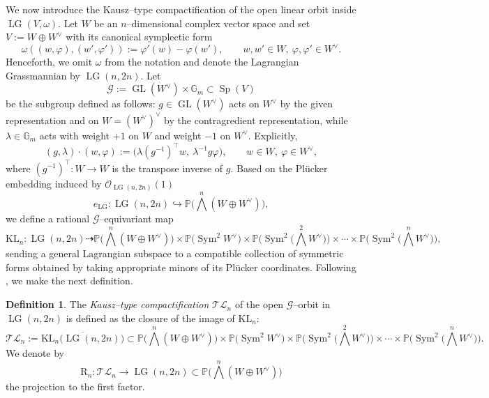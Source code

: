 \documentclass[10pt]{amsart}
\theoremstyle{definition}
\newtheorem{definition}[theorem]{Definition}
\newcommand{\Pbb}{\mathbb{P}}
\newcommand{\OO}{\mathcal{O}}
\newcommand{\LG}{\operatorname{LG}}
\DeclareMathOperator{\Sym}{Sym}
\DeclareMathOperator{\Sp}{Sp}
\newcommand{\TL}{\mathcal{TL}}
\newcommand{\GL}{\operatorname{GL}}
\newcommand{\Gm}{\mathbb{G}_m}
\newcommand{\PP}{\mathbb{P}}
\newcommand{\KL}{\mathrm{KL}}
\newcommand{\RL}{\mathrm{R}}
\theoremstyle{plain} %
\begin{document}

We now introduce the Kausz--type compactification of the open linear orbit inside $\LG(V,\omega)$. Let $W$ be an $n$--dimensional complex vector space and set $V:=W\oplus W^\vee$ with its canonical symplectic form
\[
\omega((w,\varphi),(w',\varphi')):= \varphi'(w) - \varphi(w'),
   \qquad
   w,w'\in W,\ \varphi,\varphi'\in W^\vee .
\]
Henceforth, we omit $\omega$ from the notation and denote the Lagrangian Grassmannian by $\LG(n,2n)$. Let $$\mathscr{G}:=\GL(W^\vee)\times\Gm \subset \Sp(V)$$ be the subgroup defined as follows:  $g\in\GL(W^\vee)$ acts on $W^\vee$ by the given representation
and on $W=(W^\vee)^\vee$ by the contragredient representation, while
$\lambda\in\Gm$ acts with weight $+1$ on $W$ and weight $-1$ on
$W^\vee$.  Explicitly,
\begin{equation}\label{Gm}
(g,\lambda)\cdot (w,\varphi)
  := \bigl(\lambda (g^{-1})^{\!\top} w,\ \lambda^{-1} g\varphi\bigr),
  \qquad w\in W,\ \varphi\in W^\vee ,
\end{equation}
where $(g^{-1})^{\!\top}\colon W\to W$ is the transpose inverse of $g$.
Based on the %
Plücker embedding induced by $\OO_{\LG(n,2n)}(1)$ 
\begin{equation}\label{plk}
e_{\LG}\colon\LG(n,2n)\hookrightarrow \Pbb\big(\bigwedge^n (W\oplus W^\vee)\big),
\end{equation}
we define a rational $\mathscr{G}$--equivariant map
\begin{equation}\label{kl1}
\KL_n \colon \LG(n,2n) \dashrightarrow 
\Pbb\big(\bigwedge^n (W\oplus W^\vee)\big)\times\PP\big(\Sym^2 W^\vee\big)\times
\PP\big(\Sym^2\big(\bigwedge^2 W^\vee\big)\big)\times\cdots\times
\PP\big(\Sym^2\big(\bigwedge^n W^\vee\big)\big),
\end{equation}
sending a general Lagrangian subspace to a compatible collection of symmetric forms obtained by taking appropriate minors of its Plücker coordinates.
Following \cite{FW}, we make the next definition.
\begin{definition}\label{def:TLn-Kausz}
The \emph{Kausz--type compactification} $\TL_n$ of the open $\mathscr{G}$--orbit in $\LG(n,2n)$ is defined as the closure of the image of $\KL_n$:
\[
\TL_n := \overline{\KL_n\big(\LG(n,2n)\big)} \subset 
\Pbb\big(\bigwedge^n (W\oplus W^\vee)\big)\times
\PP\big(\Sym^2 W^\vee\big)\times
\PP\big(\Sym^2\big(\bigwedge^2 W^\vee\big)\big)\times\cdots\times
\PP\big(\Sym^2\big(\bigwedge^n W^\vee\big)\big).
\]
We denote by
\begin{equation}\label{rn1}
\RL_n \colon \TL_n \longrightarrow \LG(n,2n)\subset\Pbb\big(\bigwedge^n (W\oplus W^\vee)\big)    
\end{equation}
the projection to the first factor.
\end{definition}
\end{document}

